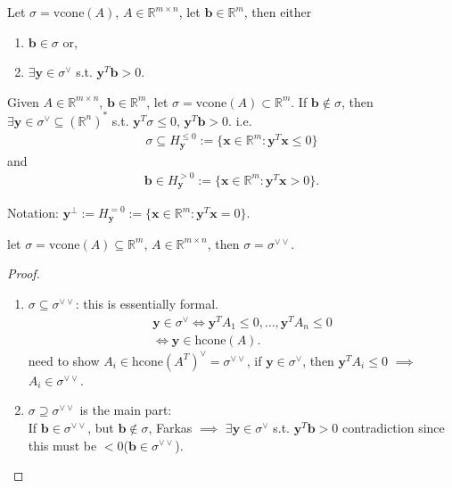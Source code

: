 \documentclass[a4paper,12pt]{amsart}
\newcommand{\RR}{\mathbb{R}}
\newcommand{\bfx}{\mathbf{x}}
\newcommand{\bfy}{\mathbf{y}}
\newcommand{\bfb}{\mathbf{b}}
\begin{document}
\begin{Corollary}
Let $\sigma=\text{vcone}(A)$, $A\in\RR^{m\times n}$, let $\bfb\in \RR^{m}$, then either
\begin{enumerate}
\item $\bfb\in \sigma$ or,
\item $\exists \bfy\in\sigma^{\vee}$ s.t. $\bfy^T\bfb>0$.
\end{enumerate}
\end{Corollary}

\begin{Corollary}
Given $A\in\RR^{m\times n}$, $\bfb\in\RR^{m}$, let $\sigma=\text{vcone}(A)\subset\RR^m$. If $\bfb\not\in \sigma$, then $\exists \bfy\in\sigma^{\vee}\subseteq(\RR^n)^{*}$ s.t. $\bfy^T\sigma\leq 0$, $\bfy^T\bfb>0$. i.e.
\begin{align*}
	\sigma\subseteq H_{\bfy}^{\leq 0}:=\{\bfx\in\RR^m:\bfy^T\bfx\leq 0\}
\end{align*}
and
\begin{align*}
\bfb\in H_{\bfy}^{> 0}:=\{\bfx\in\RR^m:\bfy^T\bfx> 0\}.
\end{align*}
\end{Corollary}

Notation: $\bfy^{\perp}:=H_{\bfy}^{= 0}:=\{\bfx\in\RR^m:\bfy^T\bfx= 0\}$.

\begin{Corollary}
let $\sigma=\text{vcone}(A)\subseteq\RR^m$, $A\in\RR^{m\times n}$, then $\sigma=\sigma^{\vee\vee}$.
\end{Corollary}
\begin{proof}
\begin{enumerate}
\item $\sigma\subseteq\sigma^{\vee\vee}$: this is essentially formal.
\begin{align*}
\bfy\in\sigma^{\vee}\iff \bfy^TA_1\leq 0,\dots,\bfy^TA_n\leq 0\\
\iff \bfy\in\text{hcone}(A).
\end{align*}
need to show $A_i\in\text{hcone}(A^T)^{\vee}=\sigma^{\vee\vee}$, if $\bfy\in\sigma^\vee$, then $\bfy^TA_i\leq 0$ $\implies$ $A_i\in\sigma^{\vee\vee}$.
\item  $\sigma\supseteq\sigma^{\vee\vee}$ is the main part:\\
If $\bfb\in\sigma^{\vee\vee}$, but $\bfb\not\in\sigma$,
Farkas $\implies$ $\exists \bfy\in\sigma^{\vee}$ s.t. $\bfy^T\bfb>0$ contradiction since this must be $<0$($\bfb\in\sigma^{\vee\vee}$).
\end{enumerate}
\end{proof}
\end{document}
